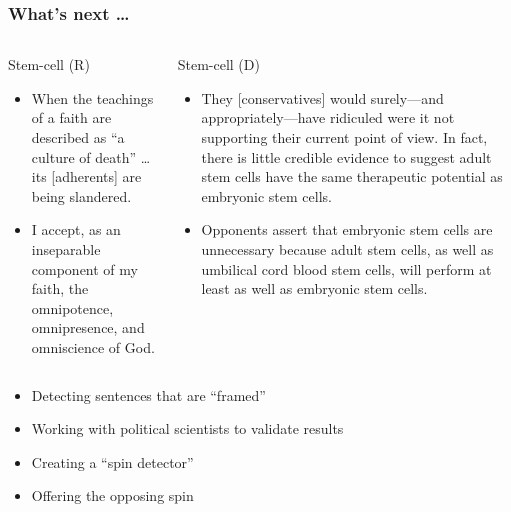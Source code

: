 \documentclass[compress]{beamer}
\begin{document}
\begin{frame}
   \frametitle{What's next \dots}

   \begin{columns}
       \begin{block}{Stem-cell (R)}
         \begin{itemize}
           \footnotesize
           \item When the teachings of a faith are described as ``a culture of death'' \dots its [adherents] are being slandered.
           \item I accept, as an inseparable component of my faith, the omnipotence, omnipresence, and omniscience of God.
         \end{itemize}
       \end{block}
       \begin{block}{Stem-cell (D)}
         \begin{itemize}
           \tiny
           \item They [conservatives] would surely---and appropriately---have
           ridiculed were it not supporting their current point of view.  In
           fact, there is little credible evidence to suggest adult stem cells
           have the same therapeutic potential as embryonic stem cells.

           \item Opponents assert that embryonic stem cells are unnecessary
           because adult stem cells, as well as umbilical cord blood stem cells,
           will perform at least as well as embryonic stem cells.

         \end{itemize}
       \end{block}
   \end{columns}

   \begin{itemize}
     \item Detecting sentences that are ``framed''
     \item Working with political scientists to validate results
     \item Creating a ``spin detector''
     \item Offering the opposing spin
   \end{itemize}

\end{frame}


%
\end{document}

